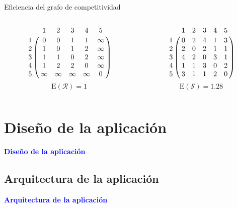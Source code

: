 \documentclass[10pt,hyperref={unicode}]{beamer}
\begin{document}
	\begin{frame}{Eficiencia del grafo de competitividad}
		\begin{ejemplo}[continuación]
			\begin{columns}[t] %
				\begin{column}{.50\textwidth}
					\begin{equation*}
					\bordermatrix{
						& 1 & 2 & 3 & 4 & 5 \cr
						1 &	0 & 0 & 1 & 1 & \infty \cr
						2 & 1 & 0 & 1 & 2 & \infty \cr
						3 & 1 & 1 & 0 & 2 & \infty \cr
						4 & 1 & 2 & 2 & 0 & \infty \cr
						5 & \infty & \infty & \infty & \infty  &  0  \cr
					}
					\end{equation*}
					\[ \mathrm{E}(\mathcal{R}) = 1 \]
				\end{column}%
				\hfill%
				\begin{column}{.50\textwidth}
					\begin{equation*}
					\bordermatrix{
						& 1 & 2 & 3 & 4 & 5 \cr
						1 &	0 & 2 & 4 & 1 & 3 \cr
						2 & 2 & 0 & 2 & 1 & 1 \cr
						3 & 4 & 2 & 0 & 3 & 1 \cr
						4 & 1 & 1 & 3 & 0 & 2 \cr
						5 & 3 & 1 & 1 & 2 & 0  \cr
					}
					\end{equation*}
					\[ \mathrm{E}(\mathcal{S}) = 1.28 \]
				\end{column}%
			\end{columns}
		\end{ejemplo}
	\end{frame}
	
	\section{Diseño de la aplicación}
	
	\begin{frame}
		\begin{center}
			\Huge\textbf{\textsf{\textcolor{blue}{Diseño de la aplicación}}}
		\end{center}
	\end{frame}
	
	\subsection{Arquitectura de la aplicación}
	
	\begin{frame}
		\begin{center}
			\Huge\textbf{\textsf{\textcolor{blue}{Arquitectura de la aplicación}}}
		\end{center}
	\end{frame}
	
\end{document}
